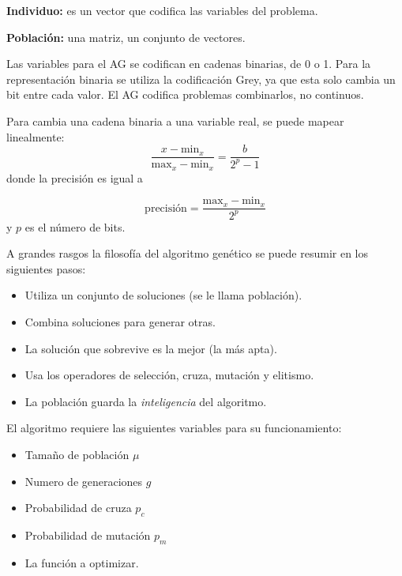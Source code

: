 \documentclass[conference]{IEEEtran}
\begin{document}
\textbf{Individuo:} es un vector que codifica las variables del problema.

\textbf{Población:} una matriz, un conjunto de vectores.

Las variables para el AG se codifican en cadenas binarias, de 0 o 1. Para la representación binaria se utiliza la codificación Grey, ya que esta solo cambia un bit entre cada valor. El AG codifica problemas combinarlos, no continuos.

Para cambia una cadena binaria a una variable real, se puede mapear linealmente:
\begin{equation}
\frac{x - \text{min}_{x}}{\text{max}_x - \text{min}_x} = \frac{b}{2^{p} -1}
\end{equation}
donde  la precisión es igual a 

\begin{equation}
 \text{precisión} = \frac{\text{max}_x - \text{min}_x}{2^{p}}
\end{equation} 
y $p$ es el número de bits.

A grandes rasgos la filosofía del algoritmo genético se puede resumir en los siguientes pasos: 
\begin{itemize}
\item Utiliza un conjunto de soluciones (se le llama población).
\item Combina soluciones para generar otras.
\item La solución que sobrevive es la mejor (la más apta).
\item Usa los operadores de selección, cruza, mutación y elitismo.
\item La población guarda la \textit{inteligencia} del algoritmo.
\end{itemize}

El algoritmo requiere las siguientes variables para su funcionamiento:
\begin{itemize}
\item Tamaño de población $\mu$
\item Numero de generaciones $g$
\item Probabilidad de cruza $p_{c}$
\item Probabilidad de mutación $p_{m}$
\item La función a optimizar.
\end{itemize}
\end{document}
